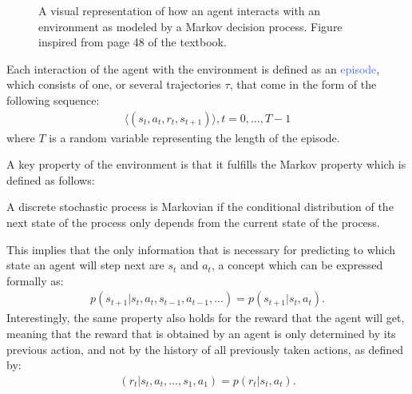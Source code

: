 \begin{figure}[htb!]
	\centering
	
\caption{A visual representation of how an agent interacts with an environment as modeled by a Markov decision process. Figure inspired from page 48 of the \citet{sutton2018reinforcement} textbook.}
  \label{fig:rl_loop}
\end{figure}

Each interaction of the agent with the environment is defined as an \textcolor{RoyalBlue}{episode}, which consists of one, or several trajectories $\tau$, that come in the form of the following sequence:
\begin{align}
	\langle(s_t,a_t,r_t,s_{t+1})\rangle,t=0,\ldots,T-1
\end{align}
where $T$ is a random variable representing the length of the episode.

A key property of the environment is that it fulfills the Markov property which is defined as follows:
\begin{definition}
	A discrete stochastic process is Markovian if the conditional distribution of the next state of the process only depends from the current state of the process.
\end{definition}
This implies that the only information that is necessary for predicting to which state an agent will step next are $s_t$ and $a_t$, a concept which can be expressed formally as:
\begin{align}
	p(s_{t+1}|s_t, a_t, s_{t-1}, a_{t-1}, \ldots) = p(s_{t+1} | s_t, a_t).
\end{align}
Interestingly, the same property also holds for the reward that the agent will get, meaning that the reward that is obtained by an agent is only determined by its previous action, and not by the history of all previously taken actions, as defined by:
\begin{align}
	(r_t| s_t, a_t, \ldots, s_1, a_1) = p(r_t|s_t,a_t).
\end{align}


